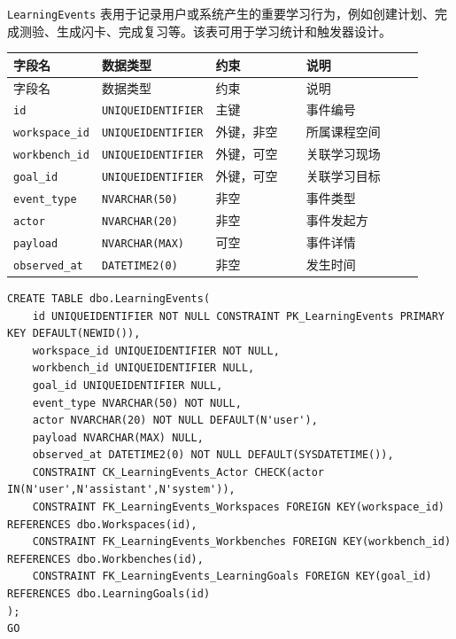\documentclass[10pt,a4paper,fontset=none]{ctexart}
\begin{document}
\texttt{LearningEvents} 表用于记录用户或系统产生的重要学习行为，例如创建计划、完成测验、生成闪卡、完成复习等。该表可用于学习统计和触发器设计。\par

\begingroup\scriptsize
\renewcommand{\arraystretch}{1.18}
\setlength{\LTleft}{0pt}
\setlength{\LTright}{0pt}
\begin{longtable}{>{\raggedright\arraybackslash}p{0.20\linewidth}>{\raggedright\arraybackslash}p{0.16\linewidth}>{\raggedright\arraybackslash}p{0.24\linewidth}>{\raggedright\arraybackslash}p{0.32\linewidth}}
\toprule
字段名 & 数据类型 & 约束 & 说明 \\
\midrule
\endfirsthead
\toprule
字段名 & 数据类型 & 约束 & 说明 \\
\midrule
\endhead
\texttt{id} & \texttt{UNIQUEIDENTIFIER} & 主键 & 事件编号 \\
\texttt{workspace\_id} & \texttt{UNIQUEIDENTIFIER} & 外键，非空 & 所属课程空间 \\
\texttt{workbench\_id} & \texttt{UNIQUEIDENTIFIER} & 外键，可空 & 关联学习现场 \\
\texttt{goal\_id} & \texttt{UNIQUEIDENTIFIER} & 外键，可空 & 关联学习目标 \\
\texttt{event\_type} & \texttt{NVARCHAR(50)} & 非空 & 事件类型 \\
\texttt{actor} & \texttt{NVARCHAR(20)} & 非空 & 事件发起方 \\
\texttt{payload} & \texttt{NVARCHAR(MAX)} & 可空 & 事件详情 \\
\texttt{observed\_at} & \texttt{DATETIME2(0)} & 非空 & 发生时间 \\
\bottomrule
\end{longtable}
\endgroup


\begin{Verbatim}[fontsize=\scriptsize,frame=single]
CREATE TABLE dbo.LearningEvents(
    id UNIQUEIDENTIFIER NOT NULL CONSTRAINT PK_LearningEvents PRIMARY KEY DEFAULT(NEWID()),
    workspace_id UNIQUEIDENTIFIER NOT NULL,
    workbench_id UNIQUEIDENTIFIER NULL,
    goal_id UNIQUEIDENTIFIER NULL,
    event_type NVARCHAR(50) NOT NULL,
    actor NVARCHAR(20) NOT NULL DEFAULT(N'user'),
    payload NVARCHAR(MAX) NULL,
    observed_at DATETIME2(0) NOT NULL DEFAULT(SYSDATETIME()),
    CONSTRAINT CK_LearningEvents_Actor CHECK(actor IN(N'user',N'assistant',N'system')),
    CONSTRAINT FK_LearningEvents_Workspaces FOREIGN KEY(workspace_id) REFERENCES dbo.Workspaces(id),
    CONSTRAINT FK_LearningEvents_Workbenches FOREIGN KEY(workbench_id) REFERENCES dbo.Workbenches(id),
    CONSTRAINT FK_LearningEvents_LearningGoals FOREIGN KEY(goal_id) REFERENCES dbo.LearningGoals(id)
);
GO
\end{Verbatim}
\end{document}
